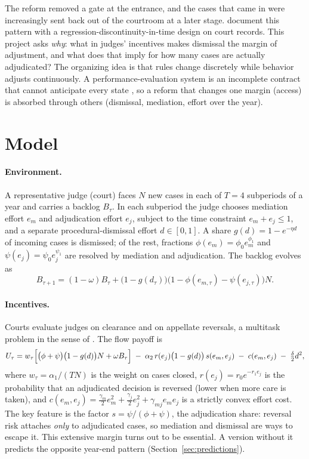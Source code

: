 \documentclass[11pt,letterpaper]{article}
\begin{document}
The reform removed a gate at the entrance, and the cases that came in were increasingly sent back out of the courtroom at a later stage. \citet{ma2026} document this pattern with a regression-discontinuity-in-time design on court records. This project asks \emph{why}: what in judges' incentives makes dismissal the margin of adjustment, and what does that imply for how many cases are actually adjudicated? The organizing idea is that rules change discretely while behavior adjusts continuously. A performance-evaluation system is an incomplete contract that cannot anticipate every state \citep{aghion1997}, so a reform that changes one margin (access) is absorbed through others (dismissal, mediation, effort over the year).

\section{Model}

\paragraph{Environment.} A representative judge (court) faces $N$ new cases in each of $T=4$ subperiods of a year and carries a backlog $B_\tau$. In each subperiod the judge chooses mediation effort $e_m$ and adjudication effort $e_j$, subject to the time constraint $e_m+e_j\le 1$, and a separate procedural-dismissal effort $d\in[0,1]$. A share $g(d)=1-e^{-\eta d}$ of incoming cases is dismissed; of the rest, fractions $\phi(e_m)=\phi_0 e_m^{\phi_1}$ and $\psi(e_j)=\psi_0 e_j^{\psi_1}$ are resolved by mediation and adjudication. The backlog evolves as
\begin{equation}
B_{\tau+1} = (1-\omega)B_\tau + \bigl(1-g(d_\tau)\bigr)\bigl(1-\phi(e_{m,\tau})-\psi(e_{j,\tau})\bigr)N .
\end{equation}

\paragraph{Incentives.} Courts evaluate judges on clearance and on appellate reversals, a multitask problem in the sense of \citet{hm1991}. The flow payoff is
\begin{equation}
U_\tau = w_\tau\Bigl[\bigl(\phi+\psi\bigr)\bigl(1-g(d)\bigr)N + \omega B_\tau\Bigr]
\;-\;\alpha_2\, r(e_j)\bigl(1-g(d)\bigr)\, s(e_m,e_j)
\;-\;c(e_m,e_j)\;-\;\tfrac{\delta}{2}d^2 ,
\end{equation}
where $w_\tau=\alpha_1/(TN)$ is the weight on cases closed, $r(e_j)=r_0e^{-r_1e_j}$ is the probability that an adjudicated decision is reversed (lower when more care is taken), and $c(e_m,e_j)=\tfrac{\gamma_m}{2}e_m^2+\tfrac{\gamma_j}{2}e_j^2+\gamma_{mj}e_me_j$ is a strictly convex effort cost. The key feature is the factor $s=\psi/(\phi+\psi)$, the adjudication share: reversal risk attaches \emph{only} to adjudicated cases, so mediation and dismissal are ways to escape it. This extensive margin turns out to be essential. A version without it predicts the opposite year-end pattern (Section~\ref{sec:predictions}).
\end{document}
